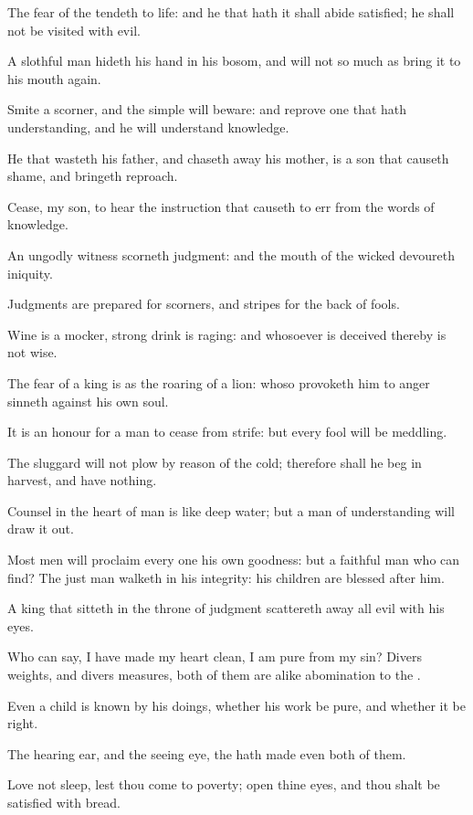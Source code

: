\Verse The fear of the \LORD tendeth to life: and he that hath it shall abide satisfied; he shall not be visited with evil.

\Verse A slothful man hideth his hand in his bosom, and will not so much as bring it to his mouth again.

\Verse Smite a scorner, and the simple will beware: and reprove one that hath understanding, and he will understand knowledge.

\Verse He that wasteth his father, and chaseth away his mother, is a son that causeth shame, and bringeth reproach.

\Verse Cease, my son, to hear the instruction that causeth to err from the words of knowledge.

\Verse An ungodly witness scorneth judgment: and the mouth of the wicked devoureth iniquity.

\Verse Judgments are prepared for scorners, and stripes for the back of fools.


\Chapter
\Verse Wine is a mocker, strong drink is raging: and whosoever is deceived thereby is not wise.

\Verse The fear of a king is as the roaring of a lion: whoso provoketh him to anger sinneth against his own soul.

\Verse It is an honour for a man to cease from strife: but every fool will be meddling.

\Verse The sluggard will not plow by reason of the cold; therefore shall he beg in harvest, and have nothing.

\Verse Counsel in the heart of man is like deep water; but a man of understanding will draw it out.

\Verse Most men will proclaim every one his own goodness: but a faithful man who can find?  \Verse The just man walketh in his integrity: his children are blessed after him.

\Verse A king that sitteth in the throne of judgment scattereth away all evil with his eyes.

\Verse Who can say, I have made my heart clean, I am pure from my sin?  \Verse Divers weights, and divers measures, both of them are alike abomination to the \LORD.

\Verse Even a child is known by his doings, whether his work be pure, and whether it be right.

\Verse The hearing ear, and the seeing eye, the \LORD hath made even both of them.

\Verse Love not sleep, lest thou come to poverty; open thine eyes, and thou shalt be satisfied with bread.

